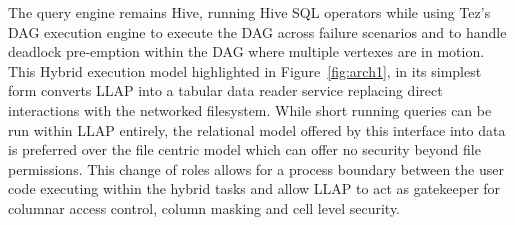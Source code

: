 The query engine remains Hive, running Hive
SQL operators while using Tez's DAG execution engine to execute the DAG across failure scenarios and to handle deadlock pre-emption within 
the DAG where multiple vertexes are in motion. This Hybrid execution model highlighted in Figure~\ref{fig:arch1}, in its simplest form 
converts LLAP into a tabular data reader service replacing direct interactions with the networked filesystem. While short running queries
can be run within LLAP entirely, the relational model offered by this interface into data is preferred over the file centric model which
can offer no security beyond file permissions. This change of roles allows for a process boundary between the user code executing within the 
hybrid tasks and allow LLAP to act as gatekeeper for columnar access control, column masking and cell level security.
